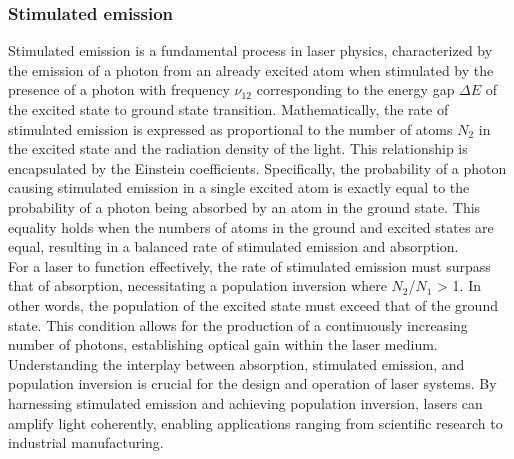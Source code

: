     \subsubsection{Stimulated emission}
    Stimulated emission is a fundamental process in laser physics, characterized by the emission of a photon from an already excited atom when stimulated by the presence of a photon with frequency $\nu_{12}$ corresponding to the energy gap $\Delta E$ of the excited state to ground state transition. 
    Mathematically, the rate of stimulated emission is expressed as proportional to the number of atoms $N_2$ in the excited state and the radiation density of the light. 
    This relationship is encapsulated by the Einstein coefficients. 
    Specifically, the probability of a photon causing stimulated emission in a single excited atom is exactly equal to the probability of a photon being absorbed by an atom in the ground state. 
    This equality holds when the numbers of atoms in the ground and excited states are equal, resulting in a balanced rate of stimulated emission and absorption. \\
    For a laser to function effectively, the rate of stimulated emission must surpass that of absorption, necessitating a population inversion where $N_2$/$N_1$ > 1. 
    In other words, the population of the excited state must exceed that of the ground state. 
    This condition allows for the production of a continuously increasing number of photons, establishing optical gain within the laser medium.
    Understanding the interplay between absorption, stimulated emission, and population inversion is crucial for the design and operation of laser systems. 
    By harnessing stimulated emission and achieving population inversion, lasers can amplify light coherently, enabling applications ranging from scientific research to industrial manufacturing.
\newpage
